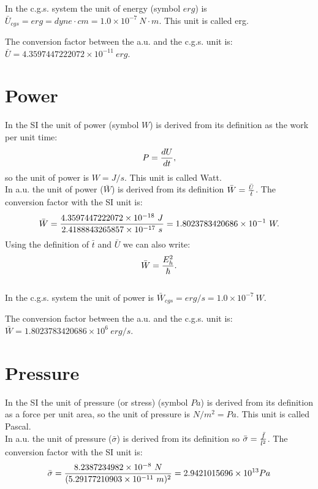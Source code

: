 \documentclass[12pt,a4paper]{article}
\def\barl{5.29177210903\times 10^{-11}}
\def\bart{2.4188843265857\times 10^{-17}}
\def\barf{8.2387234982\times 10^{-8}}
\def\baru{4.3597447222072\times 10^{-18}}
\def\barw{1.8023783420686\times 10^{-1}}
\def\barpr{2.9421015696\times 10^{13}}
\def\utou{1.0\times 10^{-7}}
\def\barucgs{4.3597447222072\times 10^{-11}}
\def\barwcgs{1.8023783420686\times 10^{6}}
\begin{document}
{\color{orange} In the c.g.s. system the unit of energy (symbol $erg$)
is $\bar U_{cgs}=erg=dyne\cdot cm = \utou\ N\cdot m$. This unit is 
called erg.
\\
}

{\color{green} The conversion factor between the a.u. and the c.g.s. unit is:
$\bar U=\barucgs\ erg$.
\\
}

\newpage
\section{\color{coral}Power}
In the SI the unit of power (symbol $W$) is derived from its
definition as the work per unit time: 
\begin{equation}
P= {d U \over d t},
\end{equation} 
so the unit of power is $W=J/s$. This unit is called Watt.
\\

{\color{web-blue} In a.u. the unit of power ($\bar W$) is derived 
from its definition $\bar W ={\bar U \over \bar t}$. The
conversion factor with the SI unit is: 
\begin{equation}
\bar W = {\baru\ J\over \bart\ s}=\barw\ W. 
\end{equation}
Using the definition of $\bar t$ and $\bar U$ we can also write:
\begin{equation}
\bar W = {E_h^2 \over \hbar}.
\end{equation}
}
\\

{\color{orange} In the c.g.s. system the unit of power is 
$\bar W_{cgs} = erg/s = \utou\ W$. 
\\
}

{\color{green} The conversion factor between the a.u. and the c.g.s. unit is:
$\bar W=\barwcgs\ erg/s$.
}

\newpage
\section{\color{coral}Pressure}
In the SI the unit of pressure (or stress) (symbol $Pa$) is derived 
from its definition as a force per unit area, so 
the unit of pressure is $N/m^2=Pa$. This unit is called Pascal.
\\

{\color{web-blue} In a.u. the unit of pressure ($\bar \sigma$) is derived from 
its definition so $\bar \sigma= {\bar f \over \bar l^2}$. The conversion
factor with the SI unit is:
\begin{equation}
\bar \sigma= {\barf\ N \over (\barl\ m )^2}=\barpr Pa
\end{equation}
}
\end{document}
